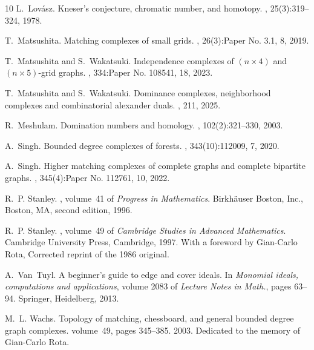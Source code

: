 \documentclass[11pt,reqno,a4paper]{amsart}
\theoremstyle{definition}
\theoremstyle{theorem}
\theoremstyle{remark}
\begin{document}
\begin{thebibliography}{10}
	L.~Lov\'asz.
	\newblock Kneser's conjecture, chromatic number, and homotopy.
	, 25(3):319--324, 1978.
	
	T.~Matsushita.
	\newblock Matching complexes of small grids.
	, 26(3):Paper No. 3.1, 8, 2019.
	
	T.~Matsushita and S.~Wakatsuki.
	\newblock Independence complexes of {$(n \times 4)$} and {$(n \times 5)$}-grid
	graphs.
	, 334:Paper No. 108541, 18, 2023.
	
	T.~Matsushita and S.~Wakatsuki.
	\newblock Dominance complexes, neighborhood complexes and combinatorial
	alexander duals.
	, 211, 2025.
	
	R.~Meshulam.
	\newblock Domination numbers and homology.
	, 102(2):321--330, 2003.
	
	A.~Singh.
	\newblock Bounded degree complexes of forests.
	, 343(10):112009, 7, 2020.
	
	A.~Singh.
	\newblock Higher matching complexes of complete graphs and complete bipartite
	graphs.
	, 345(4):Paper No. 112761, 10, 2022.
	
	R.~P. Stanley.
	, volume~41 of {\em
		Progress in Mathematics}.
	\newblock Birkh\"auser Boston, Inc., Boston, MA, second edition, 1996.
	
	R.~P. Stanley.
	, volume~49 of {\em
		Cambridge Studies in Advanced Mathematics}.
	\newblock Cambridge University Press, Cambridge, 1997.
	\newblock With a foreword by Gian-Carlo Rota, Corrected reprint of the 1986
	original.
	
	A.~Van~Tuyl.
	\newblock A beginner's guide to edge and cover ideals.
	\newblock In {\em Monomial ideals, computations and applications}, volume 2083
	of {\em Lecture Notes in Math.}, pages 63--94. Springer, Heidelberg, 2013.
	
	M.~L. Wachs.
	\newblock Topology of matching, chessboard, and general bounded degree graph
	complexes.
	\newblock volume~49, pages 345--385. 2003.
	\newblock Dedicated to the memory of Gian-Carlo Rota.
	
\end{thebibliography}

{\Addresses}
\end{document}
